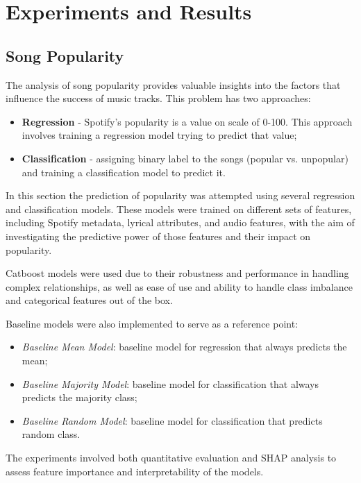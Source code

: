 \chapter{Experiments and Results}
\label{cha:experimentsandresults}

\section{Song Popularity}
\label{sec:songpopularity}

The analysis of song popularity provides valuable insights into the factors
that influence the success of music tracks. This problem has two approaches:
\begin{itemize}
  \item \textbf{Regression} - Spotify's popularity is a value on scale of
    0-100. This approach involves training a regression model trying to predict
    that value;
  \item \textbf{Classification} - assigning binary label to the songs (popular
    vs. unpopular) and training a classification model to predict it.
\end{itemize}

In this section the prediction of popularity was attempted using several
regression and classification models. These models were trained on different
sets of features, including Spotify metadata, lyrical attributes, and audio
features, with the aim of investigating the predictive power of those features
and their impact on popularity.

Catboost models were used  due to their robustness and performance in handling
complex relationships, as well as ease of use and ability to handle class
imbalance and categorical features out of the box.

Baseline models were also implemented to serve as a reference point:
\begin{itemize}
  \item \textit{Baseline Mean Model}: baseline model for regression that always
    predicts the mean;
  \item \textit{Baseline Majority Model}: baseline model for classification
    that always predicts the majority class;
  \item \textit{Baseline Random Model}: baseline model for classification that
    predicts random class.
\end{itemize}

The experiments involved both quantitative evaluation and SHAP analysis to
assess feature importance and interpretability of the models.

